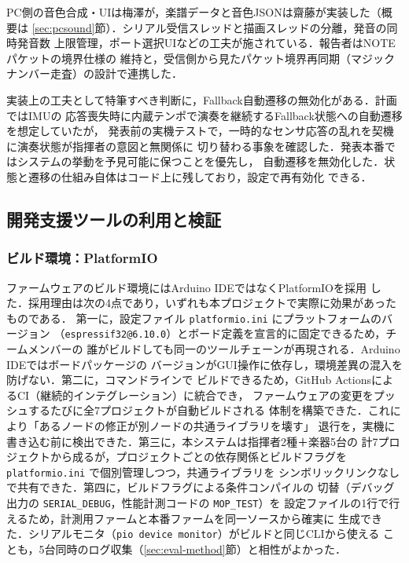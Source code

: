 \documentclass[uplatex,dvipdfmx]{jlreq}
\newcommand{\code}[1]{\texttt{#1}}
\begin{document}
PC側の音色合成・UIは梅澤が，楽譜データと音色JSONは齋藤が実装した（概要は
\ref{sec:pcsound}節）．シリアル受信スレッドと描画スレッドの分離，発音の同時発音数
上限管理，ポート選択UIなどの工夫が施されている．報告者はNOTEパケットの境界仕様の
維持と，受信側から見たパケット境界再同期（マジックナンバー走査）の設計で連携した．

実装上の工夫として特筆すべき判断に，Fallback自動遷移の無効化がある．計画ではIMUの
応答喪失時に内蔵テンポで演奏を継続するFallback状態への自動遷移を想定していたが，
発表前の実機テストで，一時的なセンサ応答の乱れを契機に演奏状態が指揮者の意図と無関係に
切り替わる事象を確認した．発表本番ではシステムの挙動を予見可能に保つことを優先し，
自動遷移を無効化した．状態と遷移の仕組み自体はコード上に残しており，設定で再有効化
できる．

\subsection{開発支援ツールの利用と検証}\label{sec:tools}

\subsubsection{ビルド環境：PlatformIO}

ファームウェアのビルド環境にはArduino IDEではなくPlatformIO\cite{platformio}を採用
した．採用理由は次の4点であり，いずれも本プロジェクトで実際に効果があったものである．
第一に，設定ファイル \code{platformio.ini} にプラットフォームのバージョン
（\code{espressif32@6.10.0}）とボード定義を宣言的に固定できるため，チームメンバーの
誰がビルドしても同一のツールチェーンが再現される．Arduino IDEではボードパッケージの
バージョンがGUI操作に依存し，環境差異の混入を防げない．第二に，コマンドラインで
ビルドできるため，GitHub ActionsによるCI（継続的インテグレーション）に統合でき，
ファームウェアの変更をプッシュするたびに全7プロジェクトが自動ビルドされる
体制を構築できた．これにより「あるノードの修正が別ノードの共通ライブラリを壊す」
退行を，実機に書き込む前に検出できた．第三に，本システムは指揮者2種＋楽器5台の
計7プロジェクトから成るが，プロジェクトごとの依存関係とビルドフラグを
\code{platformio.ini} で個別管理しつつ，共通ライブラリを
シンボリックリンクなしで共有できた．第四に，ビルドフラグによる条件コンパイルの
切替（デバッグ出力の \code{SERIAL\_DEBUG}，性能計測コードの \code{MOP\_TEST}）を
設定ファイルの1行で行えるため，計測用ファームと本番ファームを同一ソースから確実に
生成できた．シリアルモニタ（\code{pio device monitor}）がビルドと同じCLIから使える
ことも，5台同時のログ収集（\ref{sec:eval-method}節）と相性がよかった．
\end{document}
